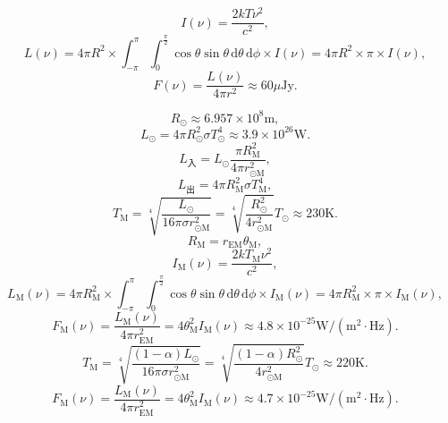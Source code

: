 \documentclass[12pt]{ctexart}
\title{}
\author{}
\def\d{\mathrm{d}}
\begin{document}
\begin{equation*}
    I(\nu)=\frac{2kT\nu^2}{c^2},
\end{equation*}
\begin{equation*}
    L(\nu)=4\pi R^2\times\int_{-\pi}^{\pi}\int_{0}^{\frac{\pi}{2}}\cos\theta\sin\theta\,\d\theta\,\d\phi\times I(\nu)=4\pi R^2\times\pi\times I(\nu),
\end{equation*}
\begin{equation*}
    F(\nu)=\frac{L(\nu)}{4\pi r^2}\approx60\mu\text{Jy}.
\end{equation*}

\begin{equation*}
    R_\odot\approx6.957\times10^8 \text{m},
\end{equation*}
\begin{equation*}
    L_\odot=4\pi R_\odot^2\sigma T_\odot^4\approx3.9\times10^{26}\text{W}.
\end{equation*}
\begin{equation*}
    L_\text{入}=L_\odot\frac{\pi R_\text{M}^2}{4\pi r_{\odot\text{M}}^2},
\end{equation*}
\begin{equation*}
    L_\text{出}=4\pi R_\text{M}^2\sigma T_\text{M}^4,
\end{equation*}
\begin{equation*}
    T_\text{M}=\sqrt[4]{\frac{L_\odot}{16\pi\sigma r_{\odot\text{M}}^2}}=\sqrt[4]{\frac{R_\odot^2}{4r_{\odot\text{M}}^2}}T_\odot\approx230\text{K}.
\end{equation*}
\begin{equation*}
    R_\text{M}=r_\text{EM}\theta_\text{M},
\end{equation*}
\begin{equation*}
    I_\text{M}(\nu)=\frac{2kT_\text{M}\nu^2}{c^2},
\end{equation*}
\begin{equation*}
    L_\text{M}(\nu)=4\pi R_\text{M}^2\times\int_{-\pi}^{\pi}\int_{0}^{\frac{\pi}{2}}\cos\theta\sin\theta\,\d\theta\,\d\phi\times I_\text{M}(\nu)=4\pi R_\text{M}^2\times\pi\times I_\text{M}(\nu),
\end{equation*}
\begin{equation*}
    F_\text{M}(\nu)=\frac{L_\text{M}(\nu)}{4\pi r_\text{EM}^2}=4\theta_\text{M}^2I_\text{M}(\nu)\approx4.8\times10^{-25}\text{W}/(\text{m}^2\cdot\text{Hz}).
\end{equation*}
\begin{equation*}
    T_\text{M}=\sqrt[4]{\frac{(1-\alpha)L_\odot}{16\pi\sigma r_{\odot\text{M}}^2}}=\sqrt[4]{\frac{(1-\alpha)R_\odot^2}{4r_{\odot\text{M}}^2}}T_\odot\approx220\text{K}.
\end{equation*}
\begin{equation*}
    F_\text{M}(\nu)=\frac{L_\text{M}(\nu)}{4\pi r_\text{EM}^2}=4\theta_\text{M}^2I_\text{M}(\nu)\approx4.7\times10^{-25}\text{W}/(\text{m}^2\cdot\text{Hz}).
\end{equation*}
\end{document}
